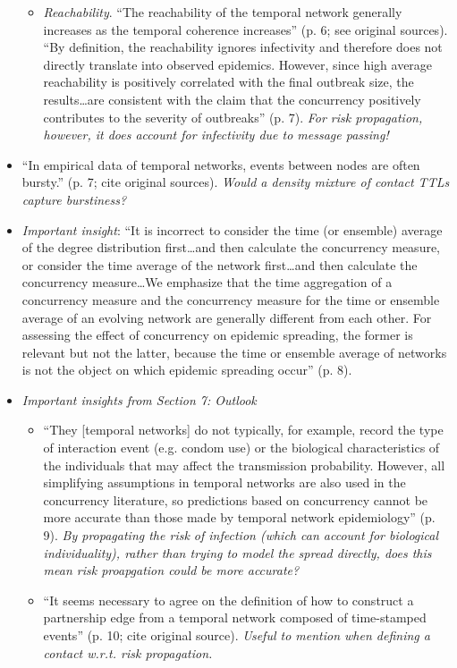 \begin{itemize}
\begin{itemize}
		\item \emph{Reachability}. ``The reachability of the temporal network generally increases as the temporal coherence increases'' (p. 6; see original sources). ``By definition, the reachability ignores infectivity and therefore does not directly translate into observed epidemics. However, since high average reachability is positively correlated with the final outbreak size, the results{\ldots}are consistent with the claim that the concurrency positively contributes to the severity of outbreaks'' (p. 7). \emph{For risk propagation, however, it does account for infectivity due to message passing!}
	\end{itemize}
\item ``In empirical data of temporal networks, events between nodes are often bursty.'' (p. 7; cite original sources). \emph{Would a density mixture of contact TTLs capture burstiness?}
\item \emph{Important insight}: ``It is incorrect to consider the time (or ensemble) average of the degree distribution first{\ldots}and then calculate the concurrency measure, or consider the time average of the network first{\ldots}and then calculate the concurrency measure{\ldots}We emphasize that the time aggregation of a concurrency measure and the concurrency measure for the time or ensemble average of an evolving network are generally different from each other. For assessing the effect of concurrency on epidemic spreading, the former is relevant but not the latter, because the time or ensemble average of networks is not the object on which epidemic spreading occur'' (p. 8).
\item \emph{Important insights from Section 7: Outlook}
	\begin{itemize}
		\item ``They [temporal networks] do not typically, for example, record the type of interaction event (e.g. condom use) or the biological characteristics of the individuals that may affect the transmission probability. However, all simplifying assumptions in temporal networks are also used in the concurrency literature, so predictions based on concurrency cannot be more accurate than those made by temporal network epidemiology'' (p. 9). \emph{By propagating the risk of infection (which can account for biological individuality), rather than trying to model the spread directly, does this mean risk proapgation could be more accurate?}
		\item ``It seems necessary to agree on the definition of how to construct a partnership edge from a temporal network composed of time-stamped events'' (p. 10; cite original source). \emph{Useful to mention when defining a contact w.r.t. risk propagation.}

\end{itemize}
\end{itemize}
